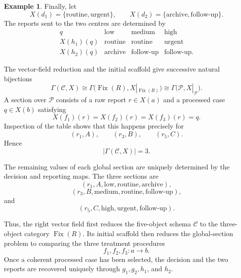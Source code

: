 \documentclass[12pt]{amsart}
\theoremstyle{definition}
\newtheorem{example}[teo]{Example}
\theoremstyle{remark}
\numberwithin{figure}{section}%
\newcommand{\CC}{\mathcal{C}}
\begin{document}
\begin{example}
Finally, let
\[
X(d_1)=\{\mathrm{routine},\mathrm{urgent}\},
\qquad
X(d_2)=\{\mathrm{archive},\mathrm{follow\mbox{-}up}\}.
\]
The reports sent to the two centres are determined by
\[
\begin{array}{c|ccc}
q
&
\mathrm{low}
&
\mathrm{medium}
&
\mathrm{high}
\\
\hline
X(h_1)(q)
&
\mathrm{routine}
&
\mathrm{routine}
&
\mathrm{urgent}
\\
X(h_2)(q)
&
\mathrm{archive}
&
\mathrm{follow\mbox{-}up}
&
\mathrm{follow\mbox{-}up}.
\end{array}
\]

The vector-field reduction and the initial scaffold give successive
natural bijections
\[
\Gamma(\CC,X)
\cong
\Gamma\bigl(
\operatorname{Fix}(R),
X|_{\operatorname{Fix}(R)}
\bigr)
\cong
\Gamma\bigl(
\mathcal P,
X|_{\mathcal P}
\bigr).
\]
A section over \(\mathcal P\) consists of a raw report
\(r\in X(a)\) and a processed case \(q\in X(b)\) satisfying
\[
X(f_1)(r)
=
X(f_2)(r)
=
X(f_3)(r)
=
q.
\]
Inspection of the table shows that this happens precisely for
\[
(r_1,A),
\qquad
(r_3,B),
\qquad
(r_5,C).
\]
Hence
\[
|\Gamma(\CC,X)|=3.
\]

The remaining values of each global section are uniquely determined by
the decision and reporting maps. The three sections are
\[
(r_1,A,\mathrm{low},\mathrm{routine},\mathrm{archive}),
\]
\[
(r_3,B,\mathrm{medium},\mathrm{routine},
\mathrm{follow\mbox{-}up}),
\]
and
\[
(r_5,C,\mathrm{high},\mathrm{urgent},
\mathrm{follow\mbox{-}up}).
\]

Thus, the right vector field first reduces the five-object schema
\(\CC\) to the three-object category \(\operatorname{Fix}(R)\). Its
initial scaffold then reduces the global-section problem to comparing the
three treatment procedures
\[
f_1,f_2,f_3\colon a\to b.
\]
Once a coherent processed case has been selected, the decision and the
two reports are recovered uniquely through \(g_1,g_2,h_1\), and \(h_2\).
\end{example}



\end{document}
